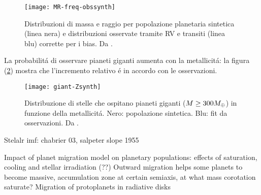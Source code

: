 \begin{figure}[!ht]\texttt{[image: MR-freq-obssynth]}\caption{Distribuzioni di massa e raggio per popolazione planetaria sintetica (linea nera) e distribuzioni osservate tramite RV e transiti (linea blu) corrette per i bias. Da \cite{mordasini2018planetary}.}\label{fig:MR-freq-obssynth}\end{figure}

La probabilit\'a di osservare pianeti giganti aumenta con la metallicit\'a: la figura (\ref{fig:giant-Zsynth}) mostra che l'incremento relativo \'e in accordo con le osservazioni.

\begin{figure}[!ht]
\texttt{[image: giant-Zsynth]}
\caption{Distribuzione di stelle che ospitano pianeti giganti ($M\geq300M_{\oplus}{}$) in funzione della metallicit\'a. Nero: popolazione sintetica. Blu: fit da osservazioni. Da \cite{mordasini2018planetary}. }\label{fig:giant-Zsynth}
\end{figure}

\begin{workout}

\end{workout}

\begin{workout}
Stelalr imf: chabrier 03, salpeter slope 1955
\end{workout}




\begin{workout}
Impact of planet migration model on planetary populations: effects of saturation, cooling and stellar irradiation (??)
Outward migration helps some planets to become massive, accumulation zone at certain semiaxis, at what mass corotation saturate?
Migration of protoplanets in radiative disks
\end{workout}
